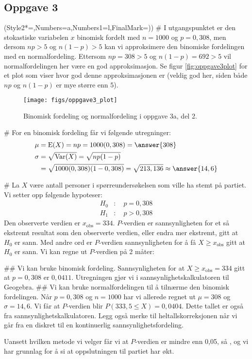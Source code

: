 \subsection*{Oppgave 3}
\begin{easylist}[enumerate]
	\ListProperties(Style2*=,Numbers=a,Numbers1=l,FinalMark={)})
	# I utgangspunktet er den stokastiske variabelen $x$ binomisk fordelt med $n = 1000$ og $p = 0,308$, men dersom $np > 5$ og $n(1-p) >5$ kan vi approksimere den binomiske fordelingen med en normalfordeling. Ettersom $np = 308 > 5 $ og $n(1-p) = 692 >5$ vil normalfordelingen her være en god approksimasjon. Se figur \eqref{fig:oppgave3plot} for et plot som viser hvor god denne approksimasjonen er (veldig god her, siden både $np$ og $n(1-p)$ er mye større enn 5).
	

	\begin{figure}[th!]
		\centering
		\texttt{[image: figs/oppgave3\_plot]}
		\caption{Binomisk fordeling og normalfordeling i oppgave 3a, del 2.}
		\label{fig:oppgave3plot}
	\end{figure}
	# For en binomisk fordeling får vi følgende utregninger:
	\begin{align*}
		\mu &= \operatorname{E}(X) = np = 1000(0,308) = \answer{308} \\
		\sigma &= \sqrt{\operatorname{Var}(X)} = \sqrt{np(1-p)} \\
		&= \sqrt{1000(0,308)(1-0,308)} = \sqrt{213,136} \approx \answer{14,6}
	\end{align*}
	
	# La $X$ være antall personer i spørreundersøkelsen som ville ha stemt på partiet.
	Vi setter opp følgende hypoteser:
	\begin{align*}
		H_0 &: \quad p = 0,308  \\
		H_1 &: \quad p > 0,308
	\end{align*}
	Den observerte verdien er $x_{\text{obs}} = 334$. $P$-verdien er sannsynligheten for et så ekstremt resultat som den observerte verdien, eller endra mer ekstremt, gitt at $H_0$ er sann. Med andre ord er $P$-verdien sannsynligheten for å få $X \geq x_{\text{obs}}$ gitt at $H_0$ er sann. Vi kan regne ut $P$-verdien på 2 måter:
	\begin{easylist}[enumerate]
	## Vi kan bruke binomisk fordeling. Sannsynligheten for at $X \geq x_{\text{obs}} = 334$ gitt at $p = 0,308$ er $0,0411$. Utregningen gjør vi i sannsynlighetskalkulatoren til Geogebra.
	## Vi kan bruke normalfordelingen til å tilnærme den binomisk fordelingen. Når $p = 0,308$ og $n=1000$ har vi allerede regnet ut $\mu = 308$ og $\sigma = 14,6$. Vi får at $P$-verdien blir $P(333,5 \leq X) = 0,0404$. Dette tallet er også fra sannsynlighetskalkulatoren. Legg også merke til heltallskorreksjonen når vi går fra en diskret til en kontinuerlig sannsynlighetsfordeling.
\end{easylist}
	Uansett hvilken metode vi velger får vi at $P$-verdien er mindre enn 0,05, så , og vi har grunnlag for å si at oppslutningen til partiet har økt.
	
\end{easylist}

